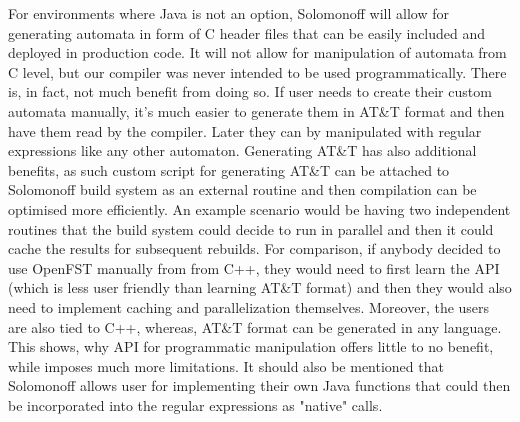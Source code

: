 For environments where Java is not an option, Solomonoff will allow for generating automata in form of C header files that can be easily included and deployed in production code. It will not allow for manipulation of automata from C level, but our compiler was never intended to be used programmatically. There is, in fact, not much benefit from doing so. If user needs to create their custom automata manually, it's much easier to generate them in AT\&T format  and then have them read by the compiler. Later they can by manipulated with regular expressions like any other automaton. Generating AT\&T has also additional benefits, as such custom script for generating AT\&T can be attached to Solomonoff build system as an external routine and then compilation can be optimised more efficiently. An example scenario would be having two independent routines that the build system could decide to run in parallel and then it could cache the results for subsequent rebuilds. For comparison, if anybody decided to use OpenFST manually from from C++, they would need to first learn the API (which is less user friendly than learning AT\&T format) and then they would also need to implement caching and parallelization themselves. Moreover, the users are also tied to C++, whereas, AT\&T format can be generated in any language. This shows, why API for programmatic  manipulation offers little to no benefit, while imposes much more limitations. It should also be mentioned that Solomonoff allows user for implementing their own Java functions that could then be incorporated into the regular expressions as "native" calls.

